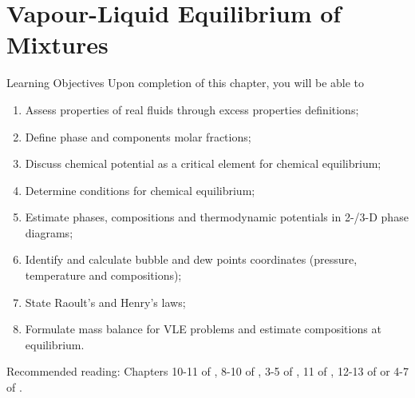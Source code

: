 \chapter{Vapour-Liquid Equilibrium of Mixtures}\label{Chapter:VLE}


   \begin{LearningObjectivesBlock}{Learning Objectives}
      Upon completion of this chapter, you will be able to
        \begin{enumerate}
           \item Assess properties of real fluids through excess properties definitions; 
           \item Define phase and components molar fractions;
           \item Discuss chemical potential as a critical element for chemical equilibrium;
           \item Determine conditions for chemical equilibrium;
           \item Estimate phases, compositions and thermodynamic potentials in 2-/3-D phase diagrams;
           \item Identify and calculate bubble and dew points coordinates (\ie pressure, temperature and compositions);
           \item State Raoult's and Henry's laws;
           \item Formulate mass balance for VLE problems and estimate compositions at equilibrium.
        \end{enumerate}
\medskip
     Recommended reading: Chapters 10-11 of \citet{SmithVanNess_Book}, 8-10 of \cite{Sandler_Book}, 3-5 of \citet{Lue_Book}, 11 of \citet{Moran_Book}, 12-13 of \citet{Devoe_Book} or 4-7 of \citet{Atkins_Book}.
   \end{LearningObjectivesBlock}


\begin{comment}
   \begin{LearningObjectivesBlock}{Learning Objectives}
      Upon completion of this chapter, you will be able to
        \begin{enumerate}
           \item {\bf Knowledge:} Define, Name, Select, State 
           \item {\bf Comprehension:} Describe, Identify, Discuss
           \item {\bf Application:} Apply, Demonstrate, Employ, Sketch
           \item {\bf Analysis:} Analyse, Compare, Calculate, Solve
           \item {\bf Synthesis:} Determine, Formulate
           \item {\bf Evaluation:} Assess, Check, Estimate, Compare, Measure, Monitor
        \end{enumerate}
\end{comment}

